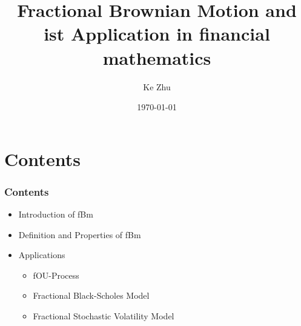 \documentclass[]{beamer}
\title[Diploma Thesis]{Fractional Brownian Motion and ist Application in financial mathematics}    %
\author{Ke Zhu}                 %
\institute[TU Dresden]{Supervisor: Prof.~Dr.~rer.~nat.~M.~Keller-Ressel}      %
\date{\today}                    %
\begin{document}
\begin{frame}
  \titlepage
\end{frame}




\section{Contents}
\begin{frame}
  \frametitle{Contents}   %

  \begin{itemize}
  \item Introduction of fBm
	\vspace{2ex}
	\pause
  \item Definition and Properties of fBm
	\vspace{2ex}
	\pause
  \item Applications
	\vspace{2ex}
	\pause
	\begin{itemize}
				\item fOU-Process 
					\vspace{1.5ex}
					\pause
				\item Fractional Black-Scholes Model
					\vspace{1.5ex}
					\pause
				\item Fractional Stochastic Volatility Model
			\end{itemize}
  \end{itemize}
\end{frame}
\end{document}
